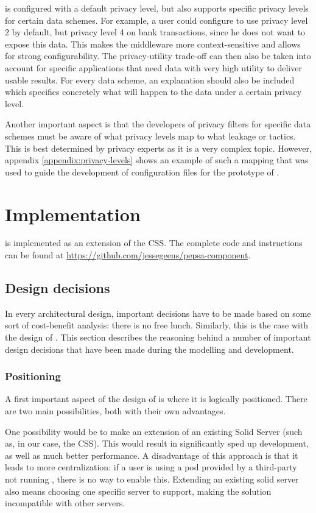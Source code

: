 \middleware{} is configured with a default privacy level, but also supports specific privacy levels for certain data schemes. For example, a user could configure \middleware{} to use privacy level 2 by default, but privacy level 4 on bank transactions, since he does not want to expose this data. This makes the middleware more context-sensitive and allows for strong configurability. The privacy-utility trade-off can then also be taken into account for specific applications that need data with very high utility to deliver usable results. For every data scheme, an explanation should also be included which specifies concretely what will happen to the data under a certain privacy level.

Another important aspect is that the developers of privacy filters for specific data schemes must be aware of what privacy levels map to what leakage or tactics. This is best determined by privacy experts as it is a very complex topic. However, appendix \ref{appendix:privacy-levels} shows an example of such a mapping that was used to guide the development of configuration files for the prototype of \middleware{}.

\section{Implementation}

\middleware{} is implemented as an extension of the \acrlong{CSS}. The complete code and instructions can be found at \url{https://github.com/jessegeens/pepsa-component}.

\subsection{Design decisions}
In every architectural design, important decisions have to be made based on some sort of cost-benefit analysis: there is no free lunch. Similarly, this is the case with the design of \middleware{}. This section describes the reasoning behind a number of important design decisions that have been made during the modelling and development.

\subsubsection{Positioning}
A first important aspect of the design of \middleware{} is where it is logically positioned. There are two main possibilities, both with their own advantages. 

One possibility would be to make \middleware{} an extension of an existing Solid Server (such as, in our case, the \gls{CSS}). This would result in significantly sped up development, as well as much better performance. A disadvantage of this approach is that it leads to more centralization: if a user is using a pod provided by a third-party not running \middleware{}, there is no way to enable this. Extending an existing solid server also means choosing one specific server to support, making the solution incompatible with other servers.

